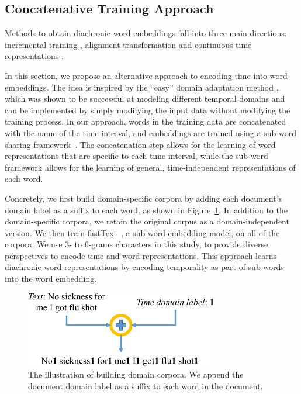 \subsection{Concatenative Training Approach}

Methods to obtain diachronic word embeddings fall into three main directions: incremental training \cite{kim2014temporal}, alignment transformation \cite{kulkarni2015statistically, hamilton2016diachronic, yao2018dynamic} and continuous time representations \cite{rosenfeld2018deep, rudolph2018dynamic}.

In this section, we propose an alternative approach 
to encoding time into word embeddings.
The idea is inspired by the ``easy'' domain adaptation method \cite{daume2007frustratingly}, which was shown to be successful at modeling different temporal domains \cite{huang2018examining} and can be implemented by simply modifying the input data without modifying the training process.
In our approach, words in the training data are concatenated with the name of the time interval,
and embeddings are trained using a sub-word sharing framework~\cite{bojanowski2017enriching}. 
The concatenation step allows for the learning of word representations that are specific to each time interval, while the sub-word framework allows for the learning of general, time-independent representations of each word.

Concretely,
we first build domain-specific corpora by adding each document's domain label as a suffix to each word, as shown in  Figure~\ref{chap3:fig:domain}. 
In addition to the domain-specific corpora,
we retain the original corpus as a domain-independent version.
We then train fastText~\cite{bojanowski2017enriching}, a sub-word embedding model, on all of the corpora,
We use 3- to 6-grams characters in this study, to provide diverse perspectives to encode time and word representations. 
This approach learns diachronic word representations by encoding temporality as part of sub-words into the word embedding. 

\begin{figure}[htp]
\centering
\includegraphics[width=0.75\textwidth]{images/chapter3/domain_doc.pdf}
\caption{The illustration of building domain corpora. We append the document domain label as a suffix to each word in the document.}
\label{chap3:fig:domain}
\end{figure}


